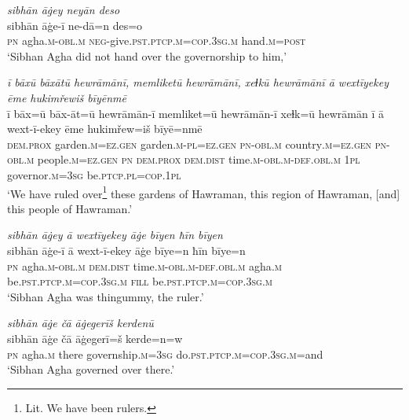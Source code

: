 \ea \label{DP.19}
\textit{sibhān āġey neyān deso} \\ 
\gll sibhān āġe-ī ne-dā=n des=o \\ 
 \textsc{pn} agha\textsc{.m}\textsc{-obl}\textsc{.m} \textsc{neg-}give\textsc{.pst}\textsc{.ptcp}\textsc{.m}\textsc{=cop}\textsc{.3sg}\textsc{.m} hand\textsc{.m}\textsc{=\textsc{post}} \\ 
\glt `Sibhan Agha did not hand over the governorship to him,'
\z 
 
\ea \label{DP.21}
\textit{ī bāxū bāxātū hewrāmānī, memliketū hewrāmānī, xeɫkū hewrāmānī ā wextīyekey ēme hukimřewiš bīyēnmē} \\ 
\gll ī bāx=ū bāx-āt=ū hewrāmān-ī memliket=ū hewrāmān-ī xeɫk=ū hewrāmān ī ā wext-ī-ekey ēme hukimřew=iš bīyē=nmē \\ 
 \textsc{dem.prox} garden\textsc{.m}\textsc{=ez}\textsc{.gen} garden\textsc{.m}\textsc{-pl}\textsc{=ez}\textsc{.gen} \textsc{pn}\textsc{-obl}\textsc{.m} country\textsc{.m}\textsc{=ez}\textsc{.gen} \textsc{pn}\textsc{-obl}\textsc{.m} people\textsc{.m}\textsc{=ez}\textsc{.gen} \textsc{pn} \textsc{dem.prox} \textsc{dem.dist} time\textsc{.m}\textsc{-obl}\textsc{.m}\textsc{-def}\textsc{.obl}\textsc{.m} \textsc{1pl} governor\textsc{.m}\textsc{=3sg} be\textsc{.ptcp}\textsc{.pl}\textsc{=cop}\textsc{.1pl} \\ 
\glt `We have ruled over\footnote{Lit. We have been rulers.} these gardens of Hawraman, this region of Hawraman, [and] this people of Hawraman.'
\z 
 
\ea \label{DP.26}
\textit{sibhān āġey ā wextīyekey āġe bīyen ħīn bīyen} \\ 
\gll sibhān āġe-ī ā wext-ī-ekey āġe bīye=n ħīn bīye=n \\ 
 \textsc{pn} agha\textsc{.m}\textsc{-obl}\textsc{.m} \textsc{dem.dist} time\textsc{.m}\textsc{-obl}\textsc{.m}\textsc{-def}\textsc{.obl}\textsc{.m} agha\textsc{.m} be\textsc{.pst}\textsc{.ptcp}\textsc{.m}\textsc{=cop}\textsc{.3sg}\textsc{.m} \textsc{fill} be\textsc{.pst}\textsc{.ptcp}\textsc{.m}\textsc{=cop}\textsc{.3sg}\textsc{.m} \\ 
\glt `Sibhan Agha was thingummy, the ruler.'
\z 
 
\ea \label{DP.27}
\textit{sibhān āġe čā āġegerīš kerdenū} \\ 
\gll sibhān āġe čā āġegerī=š kerde=n=w \\ 
 \textsc{pn} agha\textsc{.m} there governship\textsc{.m}\textsc{=3sg} do\textsc{.pst}\textsc{.ptcp}\textsc{.m}\textsc{=cop}\textsc{.3sg}\textsc{.m}=and \\ 
\glt `Sibhan Agha governed over there.'
\z 
 
